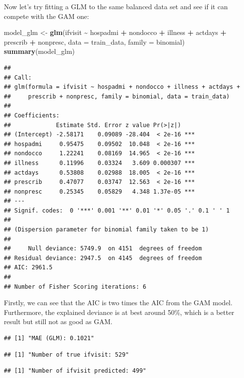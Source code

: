 \documentclass[
]{article}
\newenvironment{Shaded}{\begin{snugshade}}{\end{snugshade}}
\newcommand{\AttributeTok}[1]{\textcolor[rgb]{0.13,0.29,0.53}{#1}}
\newcommand{\FunctionTok}[1]{\textcolor[rgb]{0.13,0.29,0.53}{\textbf{#1}}}
\newcommand{\NormalTok}[1]{#1}
\newcommand{\OtherTok}[1]{\textcolor[rgb]{0.56,0.35,0.01}{#1}}
\newcommand{\SpecialCharTok}[1]{\textcolor[rgb]{0.81,0.36,0.00}{\textbf{#1}}}
\begin{document}
Now let's try fitting a GLM to the same balanced data set and see if it
can compete with the GAM one:

\begin{Shaded}
\begin{Highlighting}[]
\NormalTok{model\_glm }\OtherTok{\textless{}{-}} \FunctionTok{glm}\NormalTok{(ifvisit }\SpecialCharTok{\textasciitilde{}}\NormalTok{  hospadmi }\SpecialCharTok{+}\NormalTok{ nondocco }\SpecialCharTok{+}\NormalTok{ illness }\SpecialCharTok{+}\NormalTok{ actdays }\SpecialCharTok{+}\NormalTok{ prescrib }\SpecialCharTok{+}\NormalTok{ nonpresc, }\AttributeTok{data =}\NormalTok{ train\_data, }\AttributeTok{family =}\NormalTok{ binomial)}
\FunctionTok{summary}\NormalTok{(model\_glm)}
\end{Highlighting}
\end{Shaded}

\begin{verbatim}
## 
## Call:
## glm(formula = ifvisit ~ hospadmi + nondocco + illness + actdays + 
##     prescrib + nonpresc, family = binomial, data = train_data)
## 
## Coefficients:
##             Estimate Std. Error z value Pr(>|z|)    
## (Intercept) -2.58171    0.09089 -28.404  < 2e-16 ***
## hospadmi     0.95475    0.09502  10.048  < 2e-16 ***
## nondocco     1.22241    0.08169  14.965  < 2e-16 ***
## illness      0.11996    0.03324   3.609 0.000307 ***
## actdays      0.53808    0.02988  18.005  < 2e-16 ***
## prescrib     0.47077    0.03747  12.563  < 2e-16 ***
## nonpresc     0.25345    0.05829   4.348 1.37e-05 ***
## ---
## Signif. codes:  0 '***' 0.001 '**' 0.01 '*' 0.05 '.' 0.1 ' ' 1
## 
## (Dispersion parameter for binomial family taken to be 1)
## 
##     Null deviance: 5749.9  on 4151  degrees of freedom
## Residual deviance: 2947.5  on 4145  degrees of freedom
## AIC: 2961.5
## 
## Number of Fisher Scoring iterations: 6
\end{verbatim}

Firstly, we can see that the AIC is two times the AIC from the GAM
model. Furthermore, the explained deviance is at best around 50\%, which
is a better result but still not as good as GAM.

\begin{verbatim}
## [1] "MAE (GLM): 0.1021"
\end{verbatim}

\begin{verbatim}
## [1] "Number of true ifvisit: 529"
\end{verbatim}

\begin{verbatim}
## [1] "Number of ifvisit predicted: 499"
\end{verbatim}
\end{document}
